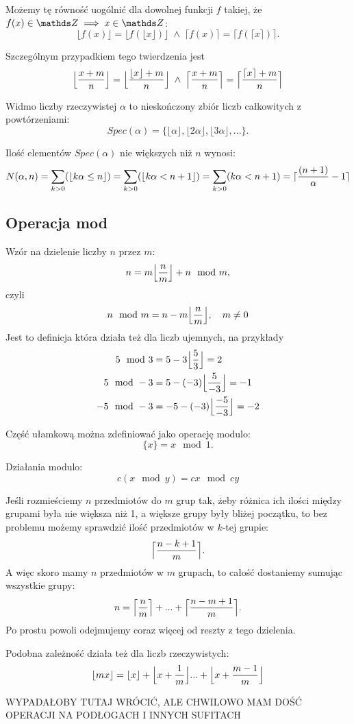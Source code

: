 Możemy tę równość uogólnić dla dowolnej funkcji $f$ takiej, że $f(x)\in \Z\implies x\in \Z$:
$$\lfloor f(x)\rfloor=\lfloor f(\lfloor x\rfloor)\rfloor\;\land\; \lceil f(x)\rceil=\lceil f(\lceil x\rceil)\rceil.$$

Szczególnym przypadkiem tego twierdzenia jest
$$\Big\lfloor {x+m\over n}\Big\rfloor=\Big\lfloor {\lfloor x\rfloor+m\over n}\Big\rfloor\;\land\;\Big\lceil {x+m\over n}\Big\rceil=\Big\lceil {\lceil x\rceil+m\over n}\Big\rceil$$

\bigskip

\bigskip

{\color{def}Widmo liczby rzeczywistej} $\alpha$ to nieskończony zbiór liczb całkowitych z powtórzeniami:
$$Spec(\alpha) = \{\lfloor\alpha\rfloor, \lfloor2\alpha\rfloor, \lfloor3\alpha\rfloor, ...\}.$$

Ilość elementów $Spec(\alpha)$ nie większych niż $n$ wynosi:
\begin{align*}
    N(\alpha, n)=\sum\limits_{k>0}(\lfloor k\alpha\leq n\rfloor)=\sum\limits_{k>0}(\lfloor k\alpha<n+1\rfloor)=\sum\limits_{k>0}(k\alpha<n+1)=\lceil {(n+1)\over\alpha}-1\rceil
\end{align*}

\subsection{Operacja mod}

Wzór na dzielenie liczby $n$ przez $m$:
$$n=m\Big\lfloor{n\over m}\Big\rfloor + n\mod m,$$
czyli
$$n\mod m=n-m\Big\lfloor{n\over m}\Big\rfloor,\quad m\neq 0$$
Jest to definicja która działa też dla liczb ujemnych, na przykłady
\begin{align*}
    5\mod 3&=5-3\Big\lfloor {5\over 3}\Big\rfloor = 2\\
    5\mod -3&=5-(-3)\Big\lfloor {5\over -3}\Big\rfloor = -1\\
    -5\mod-3&=-5-(-3)\Big\lfloor{-5\over-3}\Big\rfloor = -2
\end{align*}

Część ułamkową można zdefiniować jako operację modulo:
$$\{x\}=x\mod1.$$

Działania modulo:
$$c(x\mod y)=cx\mod cy$$

Jeśli rozmieściemy $n$ przedmiotów do $m$ grup tak, żeby różnica ich ilości między grupami była nie większa niż 1, a większe grupy były bliżej początku, to bez problemu możemy sprawdzić ilość przedmiotów w $k$-tej grupie:
$$\Big\lceil{n-k+1\over m}\Big\rceil.$$
A więc skoro mamy $n$ przedmiotów w $m$ grupach, to całość dostaniemy sumując wszystkie grupy:
$$n=\Big\lceil{n\over m}\Big\rceil+...+\Big\lceil{n-m+1\over m}\Big\rceil.$$
Po prostu powoli odejmujemy coraz więcej od reszty z tego dzielenia.\bigskip

Podobna zależność działa też dla liczb rzeczywistych:
$$\lfloor mx\rfloor = \lfloor x\rfloor+\Big\lfloor x+\frac1m\Big\rfloor...+\Big\lfloor x+{m-1\over m}\Big\rfloor$$

{\color{cyan}WYPADAŁOBY TUTAJ WRÓCIĆ, ALE CHWILOWO MAM DOŚĆ OPERACJI NA PODŁOGACH I INNYCH SUFITACH}